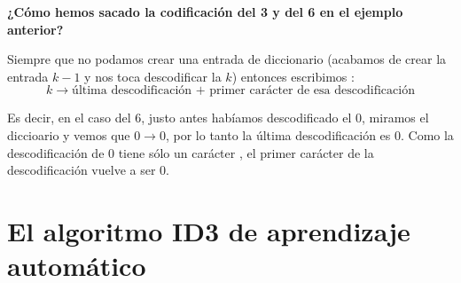 \textbf{¿Cómo hemos sacado la codificación del 3 y del 6 en el ejemplo anterior?}

Siempre que no podamos crear una entrada de diccionario (acabamos de crear la entrada $k-1$ y nos toca descodificar la $k$) entonces escribimos :
$$k \rightarrow \text{última descodificación + primer carácter de esa descodificación}$$

Es decir, en el caso del 6, justo antes habíamos descodificado el 0, miramos el diccioario y vemos que $0\rightarrow 0$, por lo tanto la última descodificación es 0. Como la descodificación de 0 tiene sólo un carácter , el primer carácter de la descodificación vuelve a ser 0.
\section{El algoritmo ID3 de aprendizaje automático}

